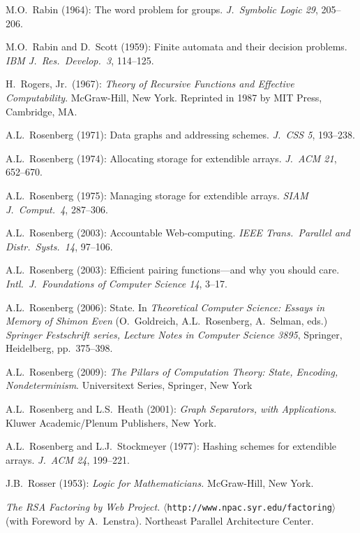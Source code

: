 \begin{thebibliography}{999}
M.O.~Rabin (1964): The word problem for groups.  {\it J.~Symbolic
Logic 29}, 205--206.

M.O.~Rabin and D.~Scott (1959): Finite automata and their decision
problems.  {\it IBM J.~Res.~Develop.~3}, 114--125.

H.~Rogers, Jr.~(1967):
{\it Theory of Recursive Functions and Effective Computability}.
McGraw-Hill, New York.  Reprinted in 1987 by MIT Press, Cambridge, MA.

A.L.~Rosenberg (1971): Data graphs and addressing schemes.  {\it
J.~CSS 5}, 193--238.

A.L.~Rosenberg (1974): Allocating storage for extendible arrays.  {\it
J.~ACM 21}, 652--670.

A.L.~Rosenberg (1975): Managing storage for extendible arrays.  {\it
SIAM J.~Comput.~4}, 287--306.

A.L.~Rosenberg (2003): Accountable Web-computing.  {\it IEEE
Trans.~Parallel and Distr.~Systs.~14}, 97--106.

A.L.~Rosenberg (2003): Efficient pairing functions---and why you
should care.  {\it Intl.~J.~Foundations of Computer Science 14},
3--17.

A.L.~Rosenberg (2006): State.  In {\it Theoretical Computer Science:
Essays in Memory of Shimon Even} (O.~Goldreich, A.L.~Rosenberg,
A.~Selman, eds.)  {\it Springer Festschrift series, Lecture Notes in
Computer Science 3895}, Springer, Heidelberg, pp.~375--398.

A.L.~Rosenberg (2009):
{\it The Pillars of Computation Theory: State, Encoding,
  Nondeterminism}.
Universitext Series, Springer, New York 

A.L.~Rosenberg and L.S.~Heath (2001):
{\it Graph Separators, with Applications}.
Kluwer Academic/Plenum Publishers, New York.

A.L.~Rosenberg and L.J.~Stockmeyer (1977): Hashing schemes for
extendible arrays.  {\it J.~ACM 24}, 199--221.

J.B.~Rosser (1953):
{\it Logic for Mathematicians.}
McGraw-Hill, New York.

{\it The RSA Factoring by Web Project.}
$\langle${\tt http://www.npac.syr.edu/factoring}$\rangle$ (with
Foreword by A.~Lenstra).  Northeast Parallel Architecture Center.


\end{thebibliography}
